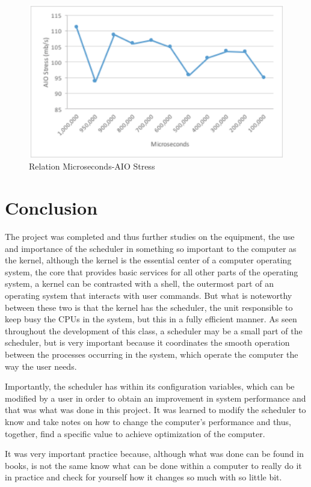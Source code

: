 \documentclass[a4paper]{article}
\begin{document}
\begin{figure}
\centering
\includegraphics[width=1.0\textwidth]{Graph_Resultados.png}
\caption{\label{fig:Resultados Gráfica} Relation Microseconds-AIO Stress }
\end{figure}

\section {Conclusion}
The project was completed and thus further studies on the equipment, the use and importance of the scheduler in something so important to the computer as the kernel, although the kernel is the essential center of a computer operating system, the core that provides basic services for all other parts of the operating system, a kernel can be contrasted with a shell, the outermost part of an operating system that interacts with user commands. But what is noteworthy between these two is that the kernel has the scheduler, the unit responsible to keep busy the CPUs in the system, but this in a fully efficient manner. As seen throughout the development of this class, a scheduler may be a small part of the scheduler, but is very important because it coordinates the smooth operation between the processes occurring in the system, which operate the computer the way the user needs.

Importantly, the scheduler has within its configuration variables, which can be modified by a user in order to obtain an improvement in system performance and that was what was done in this project. It was learned to modify the scheduler to know and take notes on how to change the computer's performance and thus, together, find a specific value to achieve optimization of the computer.

It was very important practice because, although what was done can be found in books, is not the same know what can be done within a computer to really do it in practice and check for yourself how it changes so much with so little bit.
\end{document}
